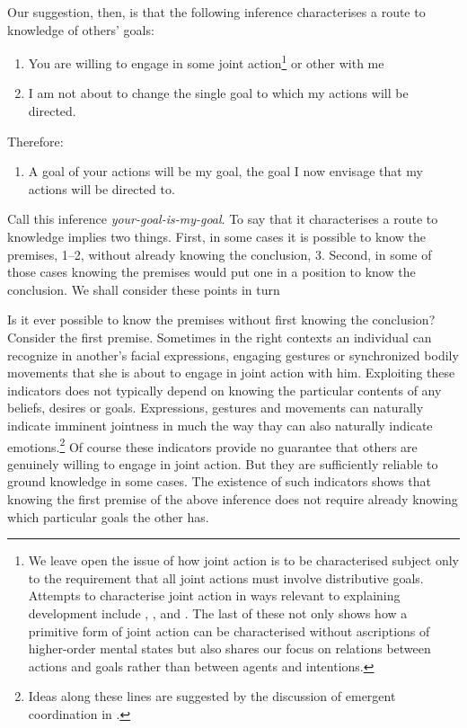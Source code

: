 \documentclass[14pt,a4paper]{extarticle}
\begin{document}
Our suggestion, then, is that the following inference characterises a route to knowledge of others’ goals:
%
\begin{enumerate}
\item You are willing to engage in some joint action\footnote{
We leave open the issue of how joint action is to be characterised subject only to the 
requirement that all joint actions must involve distributive goals.
Attempts to characterise joint action in ways relevant to explaining development include
	\citet{Tollefsen:2005vh},
	\citet{Carpenter:2009wq},
	\citet{pacherie_framing_2011} and
	\citet{Butterfill:2011fk}.
The last of these 
not only shows how a primitive form of joint action can be characterised without ascriptions of higher-order mental states
but also shares our focus on relations between actions and goals rather than between agents and intentions.
}
or other with me

\item I am not about to change the single goal to which my actions will be directed.

\end{enumerate}
%
Therefore:
%
\begin{enumerate}[resume]
%
\item A goal of your actions will be my goal, the goal I now envisage that my actions will be directed to.
\end{enumerate}
%
Call this inference \emph{your-goal-is-my-goal}.  
To say that it characterises a route to knowledge implies two things.  
First, in some cases it is possible to know the premises, 1–2, without already knowing the conclusion, 3.  
Second, in some of those cases knowing the premises would put one in a position to know the conclusion.  
We shall consider these points in turn


Is it ever possible to know the premises without first knowing the conclusion?  
Consider the first premise.  
Sometimes 
in the right contexts
an individual can recognize in another's facial expressions, engaging gestures or synchronized bodily movements that she is about to engage in joint action with him.
Exploiting these indicators does not typically depend on knowing the particular contents of any beliefs, desires or goals.  
Expressions, gestures and movements can naturally indicate imminent jointness in much the way thay can also naturally indicate emotions.\footnote{
Ideas along these lines are suggested by the discussion of {emergent coordination} in \citet{Knoblich:2010fk}.
}  
Of course these indicators provide no guarantee that others are genuinely willing to engage in joint action.  
But they are sufficiently reliable to ground knowledge in some cases.  
The existence of such indicators shows that knowing the first  premise of the above inference does not require already knowing which particular goals the other has.  
\end{document}

